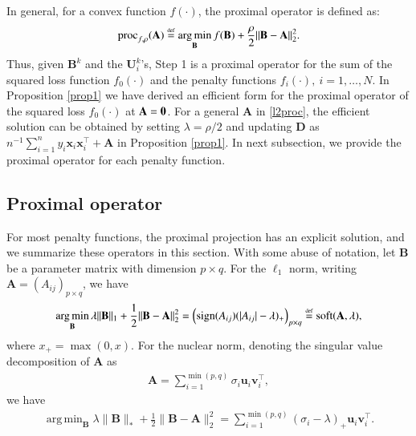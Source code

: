\documentclass[preprint,authoryear,11pt]{elsarticle}
\def\sign{\mbox{sign}}
\def\proc{\mbox{proc}}
\def\soft{\mbox{soft}}
\newcommand{\A}{\mathbf A}
\newcommand{\B}{\mathbf B}
\newcommand{\x}{\mathbf x}
\newcommand{\bu}{\mathbf u}
\newcommand{\bv}{\mathbf v}
\newcommand{\aD}{\mathbf D}
\newcommand{\bU}{\mathbf U}
\newcommand{\trans}{^\top}
\DeclareMathOperator*{\argmin}{arg\,min} %
\def\defby{\stackrel{\mbox{\textrm{\tiny def}}}{=}}
\def\defby{\stackrel{\mbox{\textrm{\tiny def}}}{=}}
\begin{document}
In general, for a convex function $f(\cdot)$, the proximal operator \citep{parikh2014proximal} is defined as: 
\begin{align} \label{l2proc}
 \proc_{f, \rho}(\A) 	\defby  \argmin_{\B}	f(\B)+\frac{\rho}{2} \|\B-\A\|_2^2  .
\end{align}
  Thus, given $\B^k$ and the $\bU_i^k$'s,  Step 1 is a proximal operator for the sum of the squared loss function $f_0(\cdot)$ and the penalty functions $f_i(\cdot),~i=1,\ldots,N$. In Proposition \ref{prop1} we have derived an efficient form for the proximal operator of the squared loss $f_0(\cdot)$ at $\A={\bf 0}$. For a general $\A$ in \eqref{l2proc}, the efficient solution can be obtained by  setting $\lambda=\rho/2$ and updating $\aD$ as $n^{-1}\sum_{i=1}^n y_i \x_i \x_i \trans+\A$ in Proposition \ref{prop1}.  In next subsection, we provide the proximal operator for each penalty function. 


   



\subsection{Proximal operator}
 

For most penalty functions, the proximal projection has an explicit solution, and we summarize these operators in this section. With some abuse of notation, let $\B$ be a parameter matrix with dimension $p\times q$. For the $\ell_1$ norm, writing $\A=(A_{ij})_{p \times q}$, we have
\begin{align*}
	\argmin_{\B}  \lambda \|\B\|_1+\frac{1}{2} \|\B-\A\|_2^2=\left( \sign(A_{ij})( |A_{ij}|-\lambda)_{+} \right)_{p \times q}\defby \soft(\A,\lambda),
\end{align*}
where $x_{+}=\max(0,x)$. For the nuclear norm, denoting the singular value decomposition of $\A$ as  
\begin{align*}
	\A=\sum_{i=1}^{\min(p,q)} \sigma_i \bu_i \bv_i\trans,	
\end{align*}
we have
\begin{align*}
	\argmin_{\B}  \lambda \|\B\|_*+\frac{1}{2} \|\B-\A\|_2^2=\sum_{i=1}^{\min(p,q)} (\sigma_i-\lambda)_{+} \bu_i \bv_i\trans.
\end{align*}
\end{document}
